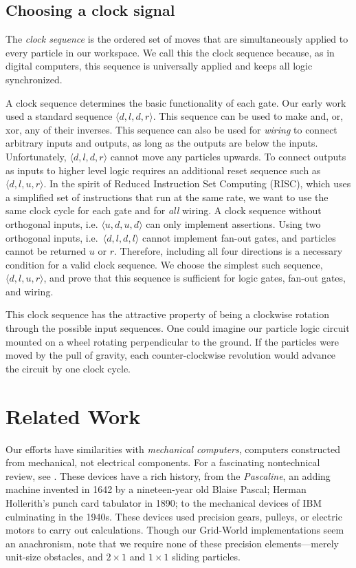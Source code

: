 \documentclass[letterpaper, 10 pt, conference]{ieeeconf}
\begin{document}
\subsection{Choosing a clock signal}

The \emph{clock sequence} is the ordered set of moves that are simultaneously applied to every particle in our workspace. We call this the clock sequence because, as in digital computers, this sequence is universally applied and keeps all logic synchronized.

A clock sequence determines the basic functionality of each gate. Our early work used a standard sequence  $\langle d,l,d,r \rangle$.  This sequence can be used to make {\sc and, or, xor}, any of their inverses.  This sequence can also be used for \emph{wiring} to connect arbitrary inputs and outputs, as long as the outputs are below the inputs.  Unfortunately, $\langle d,l,d,r \rangle$ cannot move any particles upwards. To connect outputs as inputs to higher level logic requires an additional reset sequence such as $\langle d,l,u,r \rangle$.
  In the spirit of Reduced Instruction Set Computing (RISC), which uses a simplified set of instructions that run at the same rate, we want to use the same clock cycle for each gate and for \emph{all} wiring.  A clock sequence without orthogonal inputs, i.e. $\langle u,d,u,d \rangle$ can only implement assertions.  Using two orthogonal inputs, i.e.~$\langle d,l,d,l \rangle$  cannot implement {\sc fan-out} gates, and particles cannot be returned $u$ or $r$.  Therefore, including all four directions is a necessary condition for a valid clock sequence.  We choose the simplest such sequence, $\langle d,l,u,r \rangle$, and prove that this 
sequence is sufficient for logic gates, {\sc fan-out} gates, and wiring.

This clock sequence has the attractive property of being a clockwise rotation through the possible input sequences.  One could imagine our particle logic circuit mounted on a wheel rotating perpendicular to the ground. If the particles were moved by the pull of gravity, each counter-clockwise revolution would advance the circuit by one clock cycle.




\section{Related Work}
Our efforts have similarities with \emph{mechanical computers},  computers constructed from mechanical, not electrical components. For a fascinating nontechnical review, see \cite{McCourtney1999}.  These devices have a rich history, from the \emph{Pascaline}, an adding machine invented in 1642 by a nineteen-year old Blaise Pascal; Herman Hollerith's punch card tabulator in 1890; to the mechanical devices of IBM culminating in the 1940s.  These devices used precision gears, pulleys, or electric motors to carry out calculations.  Though our {\sc Grid-World} implementations seem an anachronism, note that we require none of these precision elements---merely unit-size obstacles,  and $2\times1$ and $1\times1$ sliding particles.
\end{document}
